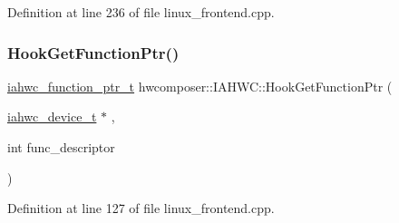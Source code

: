 Definition at line 236 of file linux\+\_\+frontend.\+cpp.


\begin{DoxyCode}{0}
\end{DoxyCode}
\mbox{\label{classhwcomposer_1_1IAHWC_aa5e1fbf26a4ea394a6acf30104e87c75}} 
\subsubsection{\texorpdfstring{Hook\+Get\+Function\+Ptr()}{HookGetFunctionPtr()}}
{\footnotesize\ttfamily \mbox{\hyperlink{iahwc_8h_a214bf51cce821fdb7b24210088c12cad}{iahwc\+\_\+function\+\_\+ptr\+\_\+t}} hwcomposer\+::\+I\+A\+H\+W\+C\+::\+Hook\+Get\+Function\+Ptr (\begin{DoxyParamCaption}\item[{\mbox{\hyperlink{iahwc_8h_aa44e63a48d7c328d160f28888a6b3edd}{iahwc\+\_\+device\+\_\+t}} $\ast$}]{,  }\item[{int}]{func\+\_\+descriptor }\end{DoxyParamCaption})\hspace{0.3cm}{\ttfamily [static]}}



Definition at line 127 of file linux\+\_\+frontend.\+cpp.


